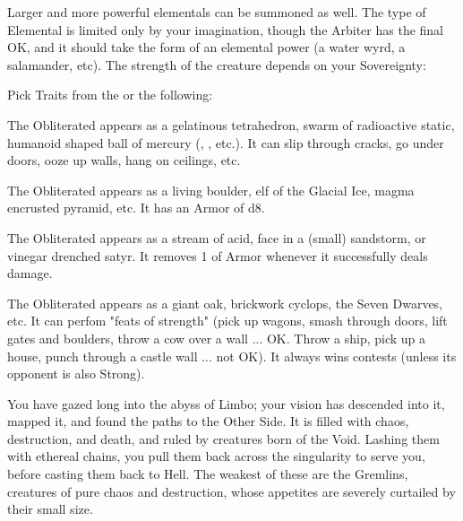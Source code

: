 \begin{multicols*}{2}
\cbreak 

 Larger and more powerful elementals can be summoned as well. The type of Elemental is limited only by your imagination, though the Arbiter has the final OK, and it should take the form of an elemental power (a water wyrd, a salamander, etc). The strength of the creature depends on your \MAX Sovereignty: 



Pick  Traits from the  or the following:

 The Obliterated appears as a gelatinous tetrahedron, swarm of radioactive static, humanoid shaped ball of mercury (, , etc.). It can slip through cracks, go under doors, ooze up walls, hang on ceilings, etc. 

 The Obliterated appears as a living boulder, elf of the Glacial Ice, magma encrusted pyramid, etc. It has an Armor of d8.

 The Obliterated appears as a stream of acid, face in a (small) sandstorm, or vinegar drenched satyr. It removes 1 \UD of Armor whenever it successfully deals damage.

 The Obliterated appears as a giant oak, brickwork cyclops, the Seven Dwarves, etc. It can perfom "feats of strength" (pick up wagons, smash through doors, lift gates and boulders, throw a cow over a wall ... OK. Throw a ship, pick up a house, punch through a castle wall ... not OK). It always wins \VIG contests (unless its opponent is also Strong).


\newpage



You have gazed long into the abyss of Limbo; your vision has descended into it, mapped it, and found the paths to the Other Side. It is filled with chaos, destruction, and death, and ruled by creatures born of the Void. Lashing them with ethereal chains, you pull them back across the singularity to serve you, before casting them back to Hell. The weakest of these are the Gremlins, creatures of pure chaos and destruction, whose appetites are severely curtailed by their small size.


\end{multicols*}
